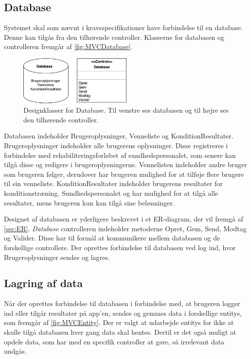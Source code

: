 \subsection*{Database}
Systemet skal som nævnt i kravsspecifikationer have forbindelse til en database. Denne kan tilgås fra den tilhørende controller. Klasserne for databasen og controlleren fremgår af \autoref{fig:MVCDatabase}. 

\begin{figure} [H]
\centering
\includegraphics[width=0.5\textwidth]{figures/MVC/MVCDatabase}
\caption{Designklasser for Database. Til venstre ses databasen og til højre ses den tilhørende controller.}
\label{fig:MVCDatabase}
\end{figure}

\noindent
Databasen indeholder Brugeroplysninger, Venneliste og KonditionResultater. Brugeroplysninger indeholder alle brugerens oplysninger. Disse registreres i forbindelse med rehabiliteringsforløbet af sundhedspersonalet, som senere kan tilgå disse og redigere i brugeroplysningerne. Vennelisten indeholder andre bruger som brugeren følger, derudover har brugeren mulighed for at tilføje flere brugere til sin venneliste. KonditionResultater indeholder brugerens resultater for konditionstræning. Sundhedspersonalet og har mulighed for at tilgå alle resultater, mens brugeren kun kan tilgå sine belønninger. 

Designet af databasen er yderligere beskrevet i et ER-diagram, der vil fremgå af \autoref{sec:ER}. \textit{Database} controlleren indeholder metoderne Opret, Gem, Send, Modtag og Valider. Disse har til formål at kommunikere mellem databasen og de forskellige controllere. Der oprettes forbindelse til databasen ved log ind, hvor Brugeroplysninger sendes og lagres.

\subsection*{Lagring af data}  \label{sec:entity}
Når der oprettes forbindelse til databasen i forbindelse med, at brugeren logger ind eller tilgår resultater på app'en, sendes og gemmes data i forskellige entitys, som fremgår af \autoref{fig:MVCEntity}. Der er valgt at udarbejde entitys for ikke at skulle tilgå databasen hver gang data skal hentes. Dertil er det også muligt at opdele data, som har med en specifik controller at gøre, så irrelevant data undgås. 

